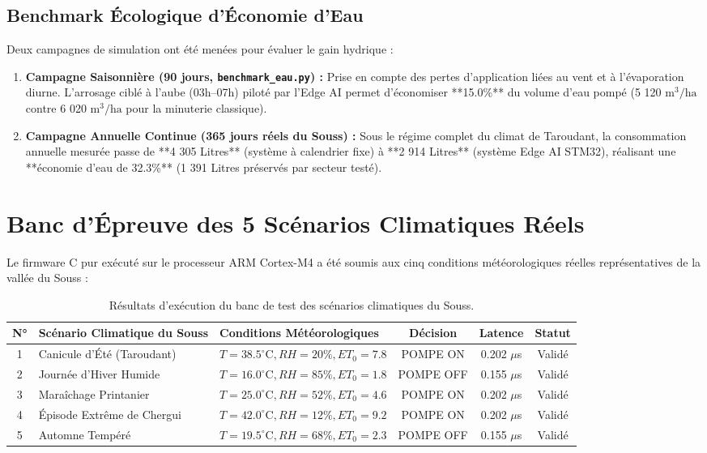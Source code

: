 \documentclass[11pt,a4paper]{report}
\begin{document}
\section{Benchmark Écologique d'Économie d'Eau}
Deux campagnes de simulation ont été menées pour évaluer le gain hydrique :
\begin{enumerate}
    \item \textbf{Campagne Saisonnière (90 jours, \texttt{benchmark\_eau.py}) :}
    Prise en compte des pertes d'application liées au vent et à l'évaporation diurne. L'arrosage ciblé à l'aube (03h--07h) piloté par l'Edge AI permet d'économiser **15.0\%** du volume d'eau pompé (5 120 $\text{m}^3/\text{ha}$ contre 6 020 $\text{m}^3/\text{ha}$ pour la minuterie classique).
    \item \textbf{Campagne Annuelle Continue (365 jours réels du Souss) :}
    Sous le régime complet du climat de Taroudant, la consommation annuelle mesurée passe de **4 305 Litres** (système à calendrier fixe) à **2 914 Litres** (système Edge AI STM32), réalisant une **économie d'eau de 32.3\%** (1 391 Litres préservés par secteur testé).
\end{enumerate}

\chapter{Banc d'Épreuve des 5 Scénarios Climatiques Réels}

Le firmware C pur exécuté sur le processeur ARM Cortex-M4 a été soumis aux cinq conditions météorologiques réelles représentatives de la vallée du Souss :

\begin{table}[H]
    \centering
    \begin{tabular}{cllccc}
        \toprule
        \textbf{N°} & \textbf{Scénario Climatique du Souss} & \textbf{Conditions Météorologiques} & \textbf{Décision} & \textbf{Latence} & \textbf{Statut} \\
        \midrule
        1 & Canicule d'Été (Taroudant) & $T=38.5^\circ\text{C}, RH=20\%, ET_0=7.8$ & POMPE ON & 0.202 $\mu$s & Validé \\
        2 & Journée d'Hiver Humide & $T=16.0^\circ\text{C}, RH=85\%, ET_0=1.8$ & POMPE OFF & 0.155 $\mu$s & Validé \\
        3 & Maraîchage Printanier & $T=25.0^\circ\text{C}, RH=52\%, ET_0=4.6$ & POMPE ON & 0.202 $\mu$s & Validé \\
        4 & Épisode Extrême de Chergui & $T=42.0^\circ\text{C}, RH=12\%, ET_0=9.2$ & POMPE ON & 0.202 $\mu$s & Validé \\
        5 & Automne Tempéré & $T=19.5^\circ\text{C}, RH=68\%, ET_0=2.3$ & POMPE OFF & 0.155 $\mu$s & Validé \\
        \bottomrule
    \end{tabular}
    \caption{Résultats d'exécution du banc de test des scénarios climatiques du Souss.}
\end{table}
\end{document}
